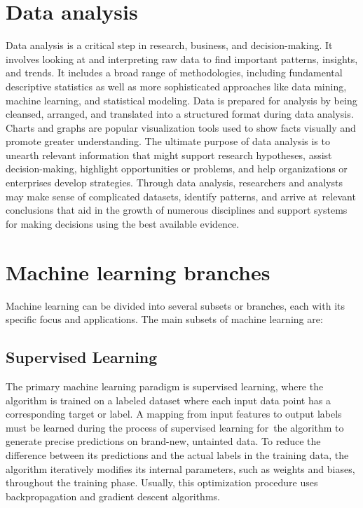 \documentclass[a4paper,11pt]{report}%
\renewcommand{\\}{\vspace*{0.5\baselineskip} \newline}
\begin{document}
\section{Data analysis}
Data analysis is a critical step in research, business, and decision-making. It involves looking at and interpreting raw data to find important patterns, insights, and trends. It includes a broad range of methodologies, including fundamental descriptive statistics as well as more sophisticated approaches like data mining, machine learning, and statistical modeling. Data is prepared for analysis by being cleansed, arranged, and translated into a structured format during data analysis. Charts and graphs are popular visualization tools used to show facts visually and promote greater understanding.
The ultimate purpose of data analysis is to unearth relevant information that might support research hypotheses, assist decision-making, highlight opportunities or problems, and help organizations or enterprises develop strategies. Through data analysis, researchers and analysts may make sense of complicated datasets, identify patterns, and arrive at relevant conclusions that aid in the growth of numerous disciplines and support systems for making decisions using the best available evidence.



\section{Machine learning branches}
Machine learning can be divided into several subsets or branches, each with its specific focus and applications. The main subsets of machine learning are:
\subsection{Supervised Learning}
The primary machine learning paradigm is supervised learning, where the algorithm is trained on a labeled dataset where each input data point has a corresponding target or label. A mapping from input features to output labels must be learned during the process of supervised learning for the algorithm to generate precise predictions on brand-new, untainted data. To reduce the difference between its predictions and the actual labels in the training data, the algorithm iteratively modifies its internal parameters, such as weights and biases, throughout the training phase. Usually, this optimization procedure uses backpropagation and gradient descent algorithms. 
\end{document}
